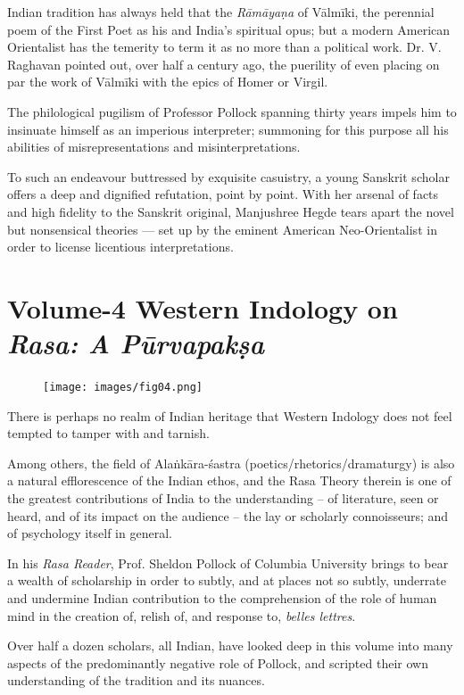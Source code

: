 Indian tradition has always held that the \textit{Rāmāyaṇa} of Vālmīki, the perennial poem of the First Poet as his and India’s spiritual opus; but a modern American Orientalist has the temerity to term it as no more than a political work. Dr. V. Raghavan pointed out, over half a century ago, the puerility of even placing on par the work of Vālmīki with the epics of Homer or Virgil.

The philological pugilism of Professor Pollock spanning thirty years impels him to insinuate himself as an imperious interpreter; summoning for this purpose all his abilities of misrepresentations and misinterpretations.

To such an endeavour buttressed by exquisite casuistry, a young Sanskrit scholar offers a deep and dignified refutation, point by point. With her arsenal of facts and high fidelity to the Sanskrit original, Manjushree Hegde tears apart the novel but nonsensical theories — set up by the eminent American Neo-Orientalist in order to license licentious interpretations.

\newpage

\section*{Volume-4 Western Indology on \textit{Rasa: A Pūrvapakṣa}}

\begin{figure}[!htbp]
\texttt{[image: images/fig04.png]}
\end{figure}

There is perhaps no realm of Indian heritage that Western Indology does not feel tempted to tamper with and tarnish.

Among others, the field of Alaṅkāra-śastra (poetics/rhetorics/\break dramaturgy) is also a natural efflorescence of the Indian ethos, and the Rasa Theory therein is one of the greatest contributions of India to the understanding – of literature, seen or heard, and of its impact on the audience – the lay or scholarly connoisseurs; and of psychology itself in general.

In his \textit{Rasa Reader}, Prof. Sheldon Pollock of Columbia University brings to bear a wealth of scholarship in order to subtly, and at places not so subtly, underrate and undermine Indian contribution to the comprehension of the role of human mind in the creation of, relish of, and response to, \textit{belles lettres}.

Over half a dozen scholars, all Indian, have looked deep in this volume into many aspects of the predominantly negative role of Pollock, and scripted their own understanding of the tradition and its nuances.

